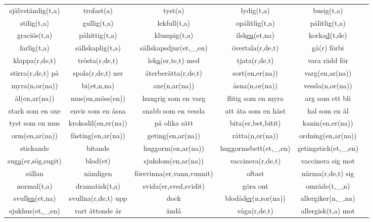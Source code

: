 \begin{center}
    \begin{adjustwidth}{-2.7cm}{}
        \begin{tabular}{|c c c c c c|}
            \hline
            självständig(t,a) & trofast(a) & tyst(a) & lydig(t,a) & busig(t,a) &  \\
            stilig(t,a) & gullig(t,a) & lekfull(t,a) & opålitlig(t,a) & pålitlig(t,a) &  \\
            graciös(t,a) & påhittig(t,a) & klumpig(t,a) & ilsk\underline{en}(et,na) & korka\underline{d}(t,de) &  \\
            farlig(t,a) & sällskaplig(t,a) & sällskapsdjur(et,\_,en) & övertala(r,de,t) & gå(r) förbi &  \\
            klappa(r,de,t) & trösta(r,de,t) & lek\underline{a}(er,te,t) med & tjata(r,de,t) & vara rädd för &  \\
            stirra(r,de,t) på & spola(r,de,t) ner & återberätta(r,de,t) & sort(en,er(na)) & varg(en,ar(na)) &  \\
            myra(n,or(na)) & bi(et,n,na) & oxe(n,ar(na)) & åsna(n,or(na)) & vessla(n,or(na)) &  \\
            ål(en,ar(na)) & mus(en,möss(en)) & hungrig som en varg & flitig som en myra & arg som ett bli &  \\
            stark som en oxe & envis som en åsna & snabb som en vessla & att äta som en häst & hal som en ål &  \\
            tyst som en mus & krokodil(en,er(na)) & på olika sätt & bita(er,bet,bitit) & kanin(en,er(na)) &  \\
            orm(en,ar(na)) & fästing(en,ar(na)) & geting(en,ar(na)) & råtta(n,or(na)) & ordning(en,ar(na)) &  \\
            stickande & bitande & huggorm(en,ar(na)) & huggormsbett(et,\_,en) & getingstick(et,\_,en) &  \\
            sug\underline{a}(er,sög,sugit) & blod(et) & sjukdom(en,ar(na)) & vaccinera(r,de,t) & vaccinera sig mot &  \\
            sällan & nämligen & försvinna(er,vann,vunnit) & oftast & närma(r,de,t) sig &  \\
            normal(t,a) & dramatisk(t,a) & svida(er,sved,svidit) & göra ont & område(t,\_,n) &  \\
            svull\underline{en}(et,na) & svullna(r,de,t) upp & dock & blodåd\underline{er}(n,ror(na)) & allergiker(n,\_,na) &  \\
            sjukhus(et,\_,en) & vart åttonde år & ändå & våga(r,de,t) & allergisk(t,a) mot &  \\

\end{tabular}
\end{adjustwidth}
\end{center}
